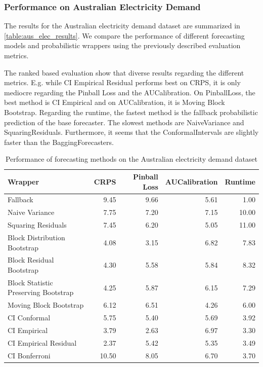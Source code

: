 \subsubsection{Performance on Australian Electricity Demand}
The results for the Australian electricity demand dataset are summarized in \autoref{table:aus_elec_results}. We compare the performance of different forecasting models and probabilistic wrappers using the previously described evaluation metrics.

The ranked based evaluation show that diverse results regarding the different metrics. E.g. while CI Empirical Residual performs best on CRPS, it is only mediocre regarding the Pinball Loss and the AUCalibration. On PinballLoss, the best method is CI Empirical and on AUCalibration, it is Moving Block Bootstrap. Regarding the runtime, the fastest method is the fallback probabilistic prediction of the base forecaster. The slowest methods are NaiveVariance and SquaringResiduals. Furthermore, it seems that the ConformalIntervals are slightly faster than the BaggingForecasters.

\begin{table}[h]
    \centering
    \caption{Performance of forecasting methods on the Australian electricity demand dataset}
    \label{table:aus_elec_results}
\begin{tabular}{lrrrr}
\toprule
Wrapper & CRPS & Pinball Loss & AUCalibration & Runtime \\
\midrule
Fallback & 9.45 & 9.66 & 5.61 & 1.00 \\
Naive Variance & 7.75 & 7.20 & 7.15 & 10.00 \\
Squaring Residuals & 7.45 & 6.20 & 5.05 & 11.00 \\
Block Distribution Bootstrap & 4.08 & 3.15 & 6.82 & 7.83 \\
Block Residual Bootstrap & 4.30 & 5.58 & 5.84 & 8.32 \\
Block Statistic Preserving Bootstrap & 4.25 & 5.87 & 6.15 & 7.29 \\
Moving Block Bootstrap & 6.12 & 6.51 & 4.26 & 6.00 \\
CI Conformal & 5.75 & 5.40 & 5.69 & 3.92 \\
CI Empirical & 3.79 & 2.63 & 6.97 & 3.30 \\
CI Empirical Residual & 2.37 & 5.42 & 5.35 & 3.49 \\
CI Bonferroni  & 10.50 & 8.05 & 6.70 & 3.70 \\
\bottomrule
\end{tabular}

\end{table}

